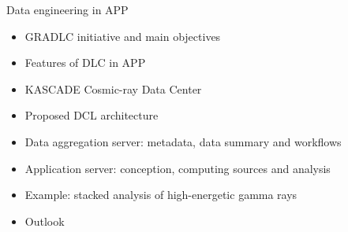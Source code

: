 \begin{frame}{Data engineering in APP}

\begin{minipage}[c]{0.52\textwidth}
\small
  \begin{itemize}
      \setlength{\itemsep}{0pt}
      \item  GRADLC initiative and main objectives
      \item  Features of DLC in APP
      \item  KASCADE Cosmic-ray Data Center
      \item  Proposed DCL architecture
      \item  Data aggregation server: metadata, data summary and workflows
      \item   Application server: conception, computing sources and analysis

      \item  Example: stacked analysis of high-energetic gamma rays
      \item  Outlook


\end{itemize}
\end{minipage}
\end{frame}
